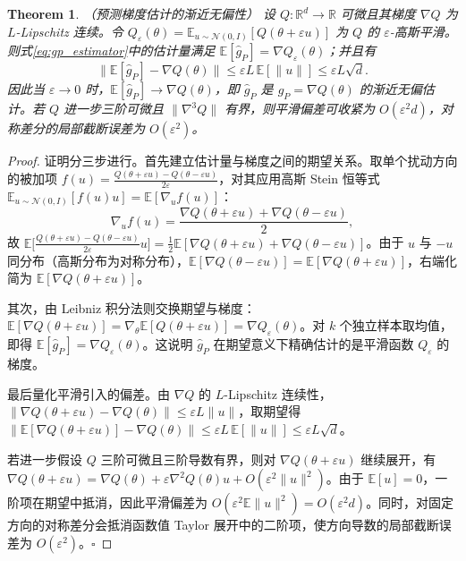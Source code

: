 \documentclass{article}
\newtheorem{theorem}{Theorem}
\begin{document}
\begin{theorem}\label{th:gp_unbiased}（预测梯度估计的渐近无偏性）
	设 $Q: \mathbb{R}^d \to \mathbb{R}$ 可微且其梯度 $\nabla Q$ 为 $L$-Lipschitz 连续。令 $Q_\varepsilon(\theta) = \mathbb{E}_{u\sim\mathcal{N}(0,I)}[Q(\theta + \varepsilon u)]$ 为 $Q$ 的 $\varepsilon$-高斯平滑。则式\ref{eq:gp_estimator}中的估计量满足 $\mathbb{E}[\hat{g}_P] = \nabla Q_\varepsilon(\theta)$；并且有
	\[
		\|\mathbb{E}[\hat{g}_P] - \nabla Q(\theta)\| \leq \varepsilon L\,\mathbb{E}[\|u\|] \leq \varepsilon L\sqrt{d}.
	\]
	因此当 $\varepsilon \to 0$ 时，$\mathbb{E}[\hat{g}_P] \to \nabla Q(\theta)$，即 $\hat{g}_P$ 是 $g_P = \nabla Q(\theta)$ 的渐近无偏估计。若 $Q$ 进一步三阶可微且 $\|\nabla^3 Q\|$ 有界，则平滑偏差可收紧为 $O(\varepsilon^2 d)$，对称差分的局部截断误差为 $O(\varepsilon^2)$。
\end{theorem}
\begin{proof}
	证明分三步进行。首先建立估计量与梯度之间的期望关系。取单个扰动方向的被加项 $f(u) = \frac{Q(\theta + \varepsilon u) - Q(\theta - \varepsilon u)}{2\varepsilon}$，对其应用高斯 Stein 恒等式 $\mathbb{E}_{u\sim\mathcal{N}(0,I)}[f(u) u] = \mathbb{E}[\nabla_u f(u)]$：
	\begin{equation*}
		\nabla_u f(u) = \frac{\nabla Q(\theta + \varepsilon u) + \nabla Q(\theta - \varepsilon u)}{2},
	\end{equation*}
	故 $\mathbb{E}\big[\frac{Q(\theta + \varepsilon u) - Q(\theta - \varepsilon u)}{2\varepsilon} u\big] = \frac{1}{2}\mathbb{E}[\nabla Q(\theta + \varepsilon u) + \nabla Q(\theta - \varepsilon u)]$。由于 $u$ 与 $-u$ 同分布（高斯分布为对称分布），$\mathbb{E}[\nabla Q(\theta - \varepsilon u)] = \mathbb{E}[\nabla Q(\theta + \varepsilon u)]$，右端化简为 $\mathbb{E}[\nabla Q(\theta + \varepsilon u)]$。

	其次，由 Leibniz 积分法则交换期望与梯度：$\mathbb{E}[\nabla Q(\theta + \varepsilon u)] = \nabla_\theta \mathbb{E}[Q(\theta + \varepsilon u)] = \nabla Q_\varepsilon(\theta)$。对 $k$ 个独立样本取均值，即得 $\mathbb{E}[\hat{g}_P] = \nabla Q_\varepsilon(\theta)$。这说明 $\hat{g}_P$ 在期望意义下精确估计的是平滑函数 $Q_\varepsilon$ 的梯度。

	最后量化平滑引入的偏差。由 $\nabla Q$ 的 $L$-Lipschitz 连续性，$\|\nabla Q(\theta + \varepsilon u) - \nabla Q(\theta)\| \leq \varepsilon L\|u\|$，取期望得 $\|\mathbb{E}[\nabla Q(\theta + \varepsilon u)] - \nabla Q(\theta)\| \leq \varepsilon L\,\mathbb{E}[\|u\|] \leq \varepsilon L \sqrt{d}$。

	若进一步假设 $Q$ 三阶可微且三阶导数有界，则对 $\nabla Q(\theta+\varepsilon u)$ 继续展开，有 $\nabla Q(\theta+\varepsilon u)=\nabla Q(\theta)+\varepsilon\nabla^2 Q(\theta)u+O(\varepsilon^2\|u\|^2)$。由于 $\mathbb{E}[u]=0$，一阶项在期望中抵消，因此平滑偏差为 $O(\varepsilon^2\mathbb{E}\|u\|^2)=O(\varepsilon^2d)$。同时，对固定方向的对称差分会抵消函数值 Taylor 展开中的二阶项，使方向导数的局部截断误差为 $O(\varepsilon^2)$。\hfill$\square$
\end{proof}
\end{document}
